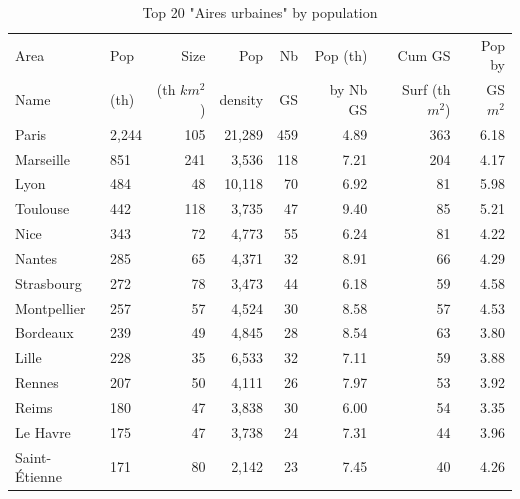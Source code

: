 \documentclass[11pt]{article}
\begin{document}
\begin{table}[H]
\caption{Top 20 "Aires urbaines" by population}
\small
\renewcommand{\arraystretch}{0.7}%

\begin{tabular}{llrrrrrr}
\toprule
Area             &      Pop   &   Size     &  Pop       & Nb         &  Pop (th)  & Cum GS          & Pop by   \\
Name             &      (th)  & (th $km^2$)&  density   & GS         &  by Nb GS  & Surf (th $m^2$) & GS $m^2$ \\
\midrule
         Paris &      2,244 &        105 &       21,289 &        459 &       4.89 &        363 &        6.18 \\
     Marseille &        851 &        241 &        3,536 &        118 &       7.21 &        204 &        4.17 \\
          Lyon &        484 &         48 &       10,118 &         70 &       6.92 &         81 &        5.98 \\
      Toulouse &        442 &        118 &        3,735 &         47 &       9.40 &         85 &        5.21 \\
          Nice &        343 &         72 &        4,773 &         55 &       6.24 &         81 &        4.22 \\
        Nantes &        285 &         65 &        4,371 &         32 &       8.91 &         66 &        4.29 \\
    Strasbourg &        272 &         78 &        3,473 &         44 &       6.18 &         59 &        4.58 \\
   Montpellier &        257 &         57 &        4,524 &         30 &       8.58 &         57 &        4.53 \\
      Bordeaux &        239 &         49 &        4,845 &         28 &       8.54 &         63 &        3.80 \\
         Lille &        228 &         35 &        6,533 &         32 &       7.11 &         59 &        3.88 \\
        Rennes &        207 &         50 &        4,111 &         26 &       7.97 &         53 &        3.92 \\
         Reims &        180 &         47 &        3,838 &         30 &       6.00 &         54 &        3.35 \\
      Le Havre &        175 &         47 &        3,738 &         24 &       7.31 &         44 &        3.96 \\
 Saint-Étienne &        171 &         80 &        2,142 &         23 &       7.45 &         40 &        4.26 \\

\end{tabular}
\end{table}
\end{document}
